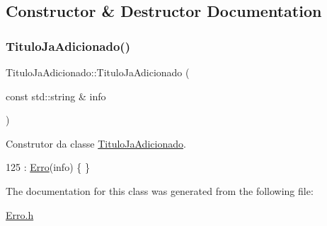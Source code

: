 \subsection{Constructor \& Destructor Documentation}
\mbox{\label{classTituloJaAdicionado_af041846009d91525ed739142e61ca035}} 
\subsubsection{\texorpdfstring{Titulo\+Ja\+Adicionado()}{TituloJaAdicionado()}}
{\footnotesize\ttfamily Titulo\+Ja\+Adicionado\+::\+Titulo\+Ja\+Adicionado (\begin{DoxyParamCaption}\item[{const std\+::string \&}]{info }\end{DoxyParamCaption})\hspace{0.3cm}{\ttfamily [inline]}}



Construtor da classe \hyperlink{classTituloJaAdicionado}{Titulo\+Ja\+Adicionado}. 


\begin{DoxyCode}
125 : \hyperlink{classErro_a15d79796bd17517ff05d45eee55556f1}{Erro}(info) \{ \}
\end{DoxyCode}


The documentation for this class was generated from the following file\+:\begin{DoxyCompactItemize}
\item 
\hyperlink{Erro_8h}{Erro.\+h}\end{DoxyCompactItemize}
